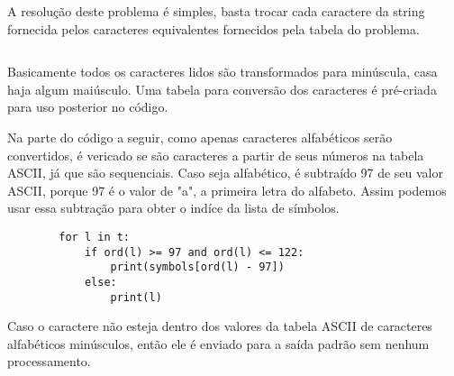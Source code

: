 A resolução deste problema é simples, basta trocar cada caractere da string fornecida pelos caracteres equivalentes fornecidos pela tabela do problema.

\begin{mdframed}[linewidth=0pt,backgroundcolor=codebgcolor]
    \inputminted[breaklines]{python}{../src/anewalphabet/anewalphabet.py}
\end{mdframed}

\par Basicamente todos os caracteres lidos são transformados para minúscula, casa haja algum maiúsculo.
Uma tabela para conversão dos caracteres é pré-criada para uso posterior no código.
\par Na parte do código a seguir, como apenas caracteres alfabéticos serão convertidos, é vericado se são caracteres a partir de seus números na tabela ASCII, já que são sequenciais. Caso seja alfabético, é subtraído 97 de seu valor ASCII, porque 97 é o valor de "a", a primeira letra do alfabeto. Assim podemos usar essa subtração para obter o indíce da lista de símbolos.

\begin{mdframed}[linewidth=0pt,backgroundcolor=codebgcolor]
    \begin{verbatim}
        for l in t:
            if ord(l) >= 97 and ord(l) <= 122:
                print(symbols[ord(l) - 97])
            else:
                print(l)
    \end{verbatim}
\end{mdframed}
\par Caso o caractere não esteja dentro dos valores da tabela ASCII de caracteres alfabéticos minúsculos, então ele é enviado para a saída padrão sem nenhum processamento.
